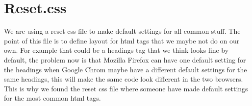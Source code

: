 \section{Reset.css}
We are using a reset css file to make default settings for all common stuff. The point of this file is to define layout for html tags that we maybe not do on our own. For example that could be a headings tag that we think looks fine by default, the problem now is that Mozilla Firefox can have one default setting for the headings when Google Chrom maybe have a different default settings for the same headings, this will make the same code look different in the two browsers. This is why we found the reset css file where someone have made default settings for the most common html tags.